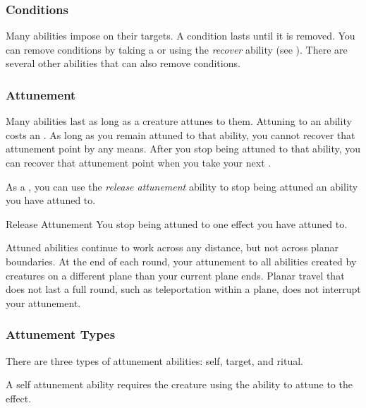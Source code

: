         \subsubsection{Conditions}\label{Conditions}
            Many abilities impose  on their targets.
            A condition lasts until it is removed.
            You can remove conditions by taking a  or using the \textit{recover} ability (see ).
            There are several other abilities that can also remove conditions.

        \subsubsection{Attunement}\label{Attunement}
            Many abilities last as long as a creature attunes to them.
            Attuning to an ability costs an .
            As long as you remain attuned to that ability, you cannot recover that attunement point by any means.
            After you stop being attuned to that ability, you can recover that attunement point when you take your next .

            As a , you can use the \textit{release attunement} ability to stop being attuned an ability you have attuned to.
            \begin{freeability}{Release Attunement}
                You stop being attuned to one effect you have attuned to.
            \end{freeability}

            Attuned abilities continue to work across any distance, but not across planar boundaries.
            At the end of each round, your attunement to all abilities created by creatures on a different plane than your current plane ends.
            Planar travel that does not last a full round, such as teleportation within a plane, does not interrupt your attunement.

            \subsubsection{Attunement Types}\label{Attunement Types}
                There are three types of attunement abilities: self, target, and ritual.

                 A self attunement ability requires the creature using the ability to attune to the effect.

